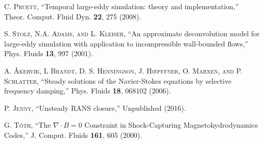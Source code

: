


\begin{thebibliography}{99}

 \textsc {C. Pruett,}  ``Temporal large-eddy simulation: theory and implementation,'' Theor. Comput. Fluid Dyn. \textbf{22}, 275 (2008).

 \textsc {S. Stolz, N.A. Adams, and L. Kleiser,}  ``An approximate deconvolution model for large-eddy simulation with application to incompressible wall-bounded flows,'' Phys. Fluids  \textbf{13}, 997 (2001).

 \textsc {A. \AA kervik, L Brandt, D. S. Henningson, J. H\oe pffner, O. Marxen, and P. Schlatter,}  ``Steady solutions of the Navier-Stokes equations by selective frequency damping,'' Phys. Fluids  \textbf{18}, 068102 (2006).

 \textsc {P. Jenny,}  ``Unsteady RANS closure,'' Unpublished (2016).

 \textsc {G. T\'oth,}  ``The $\nabla \cdot B=0$ Constraint in Shock-Capturing Magnetohydrodynamics Codes,'' J. Comput. Fluids \textbf{161}, 605 (2000).

 
\end{thebibliography}
